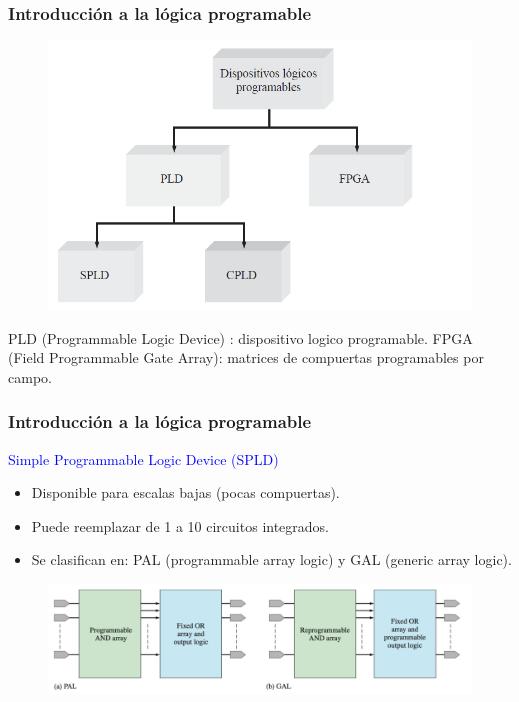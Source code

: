 \documentclass[10.5pt,scale=1.0,t,aspectratio=169,hyperref={pdfpagelabels=false}]{beamer}
\begin{document}
\begin{frame}
	\frametitle{Introducción a la lógica programable}
	\vspace{-0.1in}
\begin{figure}
	\centering
	\includegraphics[scale=0.5]{LogicaProgramable}
\end{figure}
PLD (Programmable Logic Device) : dispositivo logico programable.
FPGA (Field Programmable Gate Array): matrices de compuertas programables por campo. 
\end{frame}

\begin{frame}
	\frametitle{Introducción a la lógica programable}
	\vspace{-0.1in}
\textcolor{blue}{\large Simple Programmable Logic Device (SPLD)} \\
\begin{itemize}
	\item Disponible para escalas bajas (pocas compuertas).
	\item Puede reemplazar de 1 a 10 circuitos integrados.
	\item Se clasifican en: PAL (programmable array logic) y GAL (generic array logic).
\end{itemize}
\begin{figure}
	\centering
	\includegraphics[scale=0.5]{PAL_GAL}
\end{figure}
\end{frame}
\end{document}

